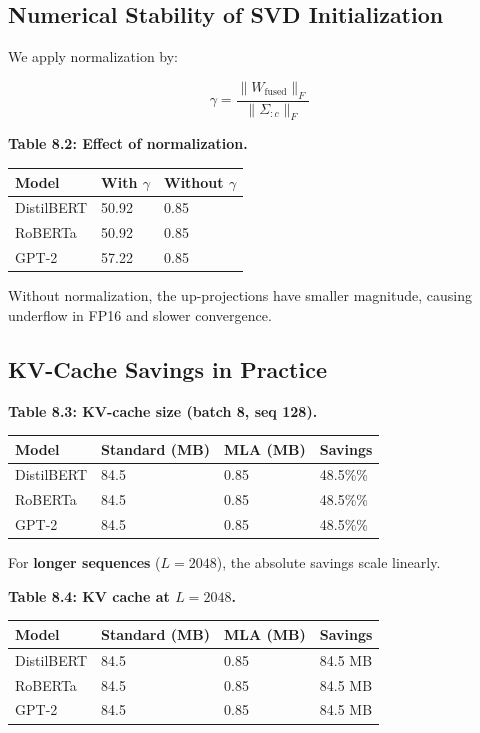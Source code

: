 \subsection{Numerical Stability of SVD Initialization}

We apply normalization by:

\[
\gamma = \frac{\|W_\text{fused}\|_F}{\|\Sigma_{:c}\|_F}
\tag{8.1}
\]

\textbf{Table 8.2: Effect of normalization.}

\begin{table}[H]
\centering
\small
\begin{tabular}{lll}
\toprule
\textbf{Model} & \textbf{With $\gamma$} & \textbf{Without $\gamma$} \\
\midrule
DistilBERT & 50.92 & 0.85 \\
RoBERTa & 50.92 & 0.85 \\
GPT-2 & 57.22 & 0.85 \\
\bottomrule
\end{tabular}
\end{table}

Without normalization, the up-projections have smaller magnitude, causing 
underflow in FP16 and slower convergence.

\subsection{KV-Cache Savings in Practice}

\textbf{Table 8.3: KV-cache size (batch 8, seq 128).}

\begin{table}[H]
\centering
\small
\begin{tabular}{llll}
\toprule
\textbf{Model} & \textbf{Standard (MB)} & \textbf{MLA (MB)} & \textbf{Savings} \\
\midrule
DistilBERT & 84.5 & 0.85 & 48.5\%\% \\
RoBERTa & 84.5 & 0.85 & 48.5\%\% \\
GPT-2 & 84.5 & 0.85 & 48.5\%\% \\
\bottomrule
\end{tabular}
\end{table}

For \textbf{longer sequences} ($L = 2048$), the absolute savings scale linearly.

\textbf{Table 8.4: KV cache at $L = 2048$.}

\begin{table}[H]
\centering
\small
\begin{tabular}{llll}
\toprule
\textbf{Model} & \textbf{Standard (MB)} & \textbf{MLA (MB)} & \textbf{Savings} \\
\midrule
DistilBERT & 84.5 & 0.85 & 84.5 MB \\
RoBERTa & 84.5 & 0.85 & 84.5 MB \\
GPT-2 & 84.5 & 0.85 & 84.5 MB \\
\bottomrule
\end{tabular}
\end{table}

